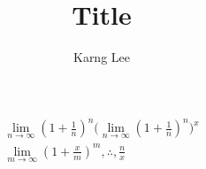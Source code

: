 \documentclass{article}
\title{Title}
\author{Karng Lee}
\theoremstyle{mytheoremstyle}
\theoremstyle{mytheoremstyle}
\theoremstyle{myproblemstyle}
\begin{document}
    \maketitle
\begin{align}
  \lim_{n\to\infty}(1+\frac{1}{n})^n
     \big(\lim_{n\to\infty}(1+\frac{1}{n})^n\big)^x \\
     \lim_{m\to\infty}(1+\frac{x}{m})^m, \therefore, \frac{n}{x} \\
\end{align} 
\end{document}
